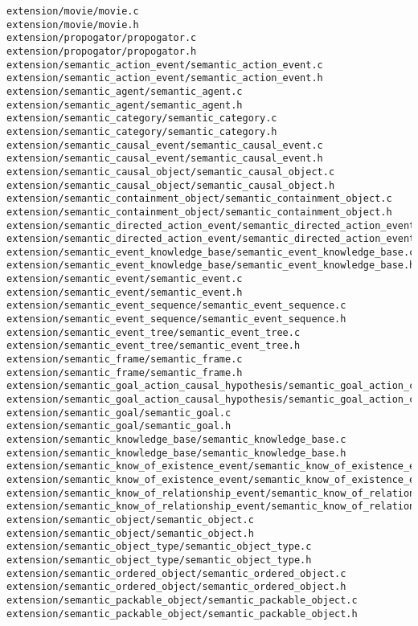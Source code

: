 \begin{lstlisting}
extension/movie/movie.c
extension/movie/movie.h
extension/propogator/propogator.c
extension/propogator/propogator.h
extension/semantic_action_event/semantic_action_event.c
extension/semantic_action_event/semantic_action_event.h
extension/semantic_agent/semantic_agent.c
extension/semantic_agent/semantic_agent.h
extension/semantic_category/semantic_category.c
extension/semantic_category/semantic_category.h
extension/semantic_causal_event/semantic_causal_event.c
extension/semantic_causal_event/semantic_causal_event.h
extension/semantic_causal_object/semantic_causal_object.c
extension/semantic_causal_object/semantic_causal_object.h
extension/semantic_containment_object/semantic_containment_object.c
extension/semantic_containment_object/semantic_containment_object.h
extension/semantic_directed_action_event/semantic_directed_action_event.c
extension/semantic_directed_action_event/semantic_directed_action_event.h
extension/semantic_event_knowledge_base/semantic_event_knowledge_base.c
extension/semantic_event_knowledge_base/semantic_event_knowledge_base.h
extension/semantic_event/semantic_event.c
extension/semantic_event/semantic_event.h
extension/semantic_event_sequence/semantic_event_sequence.c
extension/semantic_event_sequence/semantic_event_sequence.h
extension/semantic_event_tree/semantic_event_tree.c
extension/semantic_event_tree/semantic_event_tree.h
extension/semantic_frame/semantic_frame.c
extension/semantic_frame/semantic_frame.h
extension/semantic_goal_action_causal_hypothesis/semantic_goal_action_causal_hypothesis.c
extension/semantic_goal_action_causal_hypothesis/semantic_goal_action_causal_hypothesis.h
extension/semantic_goal/semantic_goal.c
extension/semantic_goal/semantic_goal.h
extension/semantic_knowledge_base/semantic_knowledge_base.c
extension/semantic_knowledge_base/semantic_knowledge_base.h
extension/semantic_know_of_existence_event/semantic_know_of_existence_event.c
extension/semantic_know_of_existence_event/semantic_know_of_existence_event.h
extension/semantic_know_of_relationship_event/semantic_know_of_relationship_event.c
extension/semantic_know_of_relationship_event/semantic_know_of_relationship_event.h
extension/semantic_object/semantic_object.c
extension/semantic_object/semantic_object.h
extension/semantic_object_type/semantic_object_type.c
extension/semantic_object_type/semantic_object_type.h
extension/semantic_ordered_object/semantic_ordered_object.c
extension/semantic_ordered_object/semantic_ordered_object.h
extension/semantic_packable_object/semantic_packable_object.c
extension/semantic_packable_object/semantic_packable_object.h

\end{lstlisting}
